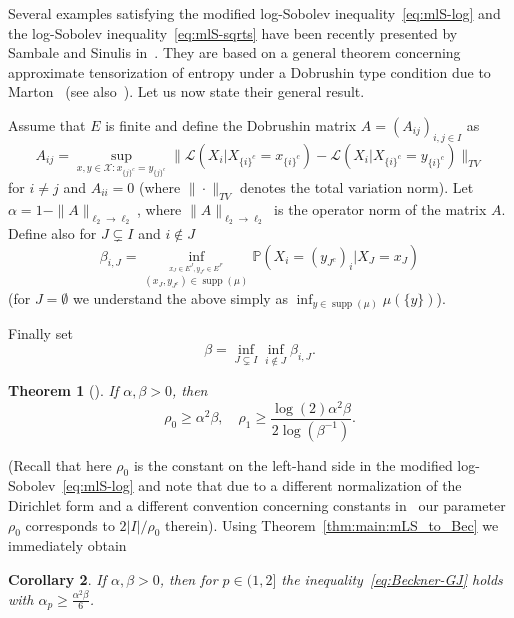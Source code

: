 \documentclass[a4paper]{amsart}
\newtheorem{theorem}{Theorem}[section]
\newtheorem{corollary}[theorem]{Corollary} %
\theoremstyle{definition}
\theoremstyle{remark}
\numberwithin{equation}{section}
\newcommand*{\PP}{\mathbb{P}} %
\DeclareMathOperator{\supp}{supp}
\begin{document}
Several examples satisfying the modified log-Sobolev inequality~\eqref{eq:mlS-log} and the log-Sobolev inequality~\eqref{eq:mlS-sqrts} have been recently presented by Sambale and Sinulis in~\cite{Sambale_2020}. They are based on a general theorem concerning approximate tensorization of entropy under a Dobrushin type condition due to Marton~\cite{MR4015662} (see also~\cite{gtze2018higher}).
Let us now state their general result.

Assume that $E$ is finite and define the Dobrushin matrix  $A= (A_{ij})_{i,j\in I}$ as
\begin{displaymath}
  A_{ij} = \sup_{x,y\in \mathcal{X}\colon x_{\{j\}^c} = y_{\{j\}^c}} \|\mathcal{L}(X_i|X_{\{i\}^c} = x_{\{i\}^c}) - \mathcal{L}(X_i|X_{\{i\}^c} = y_{\{i\}^c})\|_{TV}
\end{displaymath}
for $i\neq j$ and $A_{ii} = 0$  (where $\|\cdot\|_{TV}$ denotes the total variation norm). Let  $\alpha = 1 - \|A\|_{\ell_2\to \ell_2}$, where $\|A\|_{\ell_2\to \ell_2}$ is the operator norm of the matrix $A$.
Define also for $J \subsetneq I$ and $i \notin J$
\begin{displaymath}
  \beta_{i,J} = \inf_{\stackrel{x_J \in E^J, y_{J^c} \in E^{J^c}}{(x_{J},y_{J^c}) \in \supp(\mu)}} \PP(X_i = (y_{J^c})_i|X_J = x_J)
\end{displaymath}
(for $J = \emptyset$ we understand the above simply as $\inf_{y \in \supp(\mu)} \mu(\{y\})$).

Finally set
\begin{displaymath}
  \beta = \inf_{J\subsetneq I}\inf_{i\notin J}\beta_{i,J}.
\end{displaymath}


\begin{theorem}[{\cite[Theorem 4.1]{Sambale_2020}}] \label{thm:Sambale}
If $\alpha,\beta > 0$, then
\begin{displaymath}
  \rho_0 \ge \alpha^2\beta,\quad \rho_1 \ge  \frac{\log(2)\alpha^2\beta}{2\log(\beta^{-1})}.
\end{displaymath}
\end{theorem}

(Recall that here $\rho_0$ is the constant on the left-hand side in the modified log-Sobolev~\eqref{eq:mlS-log} and note that due to a different normalization of the Dirichlet form and a different convention concerning constants in~\cite{Sambale_2020} our parameter $\rho_0$ corresponds to $2|I|/\rho_0$ therein).
Using Theorem~\ref{thm:main:mLS_to_Bec} we immediately obtain

\begin{corollary} If $\alpha, \beta > 0$, then for $p \in (1,2]$ the inequality~\eqref{eq:Beckner-GJ} holds with $\alpha_p \ge \frac{\alpha^2\beta}{6}$.
\end{corollary}
\end{document}
